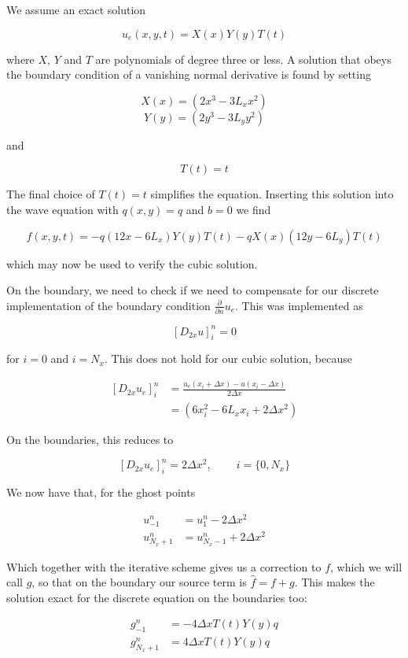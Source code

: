 \documentclass[letterpaper,10pt,english]{/usr/share/sphinx/texinputs/sphinxhowto}
\begin{document}
We assume an exact solution

\[u_e(x,y,t) = X(x)Y(y)T(t)\]

where $X$, $Y$ and $T$ are polynomials of degree three or less. A
solution that obeys the boundary condition of a vanishing normal
derivative is found by setting

\[X(x) = (2x^3 - 3 L_x x^2)\] \[Y(y) = (2y^3 - 3 L_y y^2)\]

and

\[T(t) = t\]

The final choice of $T(t) = t$ simplifies the equation. Inserting this
solution into the wave equation with $q(x,y)=q$ and $b=0$ we find

\[f(x,y,t) = - q (12x - 6L_x) Y(y) T(t) - q X(x)(12y - 6L_y) T(t)\]

which may now be used to verify the cubic solution.

On the boundary, we need to check if we need to compensate for our
discrete implementation of the boundary condition
$\frac{\partial}{\partial n}u_e$. This was implemented as

\[ \left [ D_{2x} u \right]_{i}^n = 0 \]

for $i=0$ and $i=N_x$. This does not hold for our cubic solution,
because

\begin{align*} 
   \left [ D_{2x} u_e \right ]_{i}^n &= \frac{u_e(x_i + \Delta x) - u(x_i - \Delta x)}{2 \Delta x} \\
                                     &= (6x_i^2 - 6 L_x x_i + 2 \Delta x^2)
\end{align*}

On the boundaries, this reduces to

\[
\left [ D_{2x} u_e \right ]_{i}^n = 2 \Delta x^2, \qquad \ i = \{0,N_x\}
\]

We now have that, for the ghost points

\begin{align*}
    u_{-1}^n &= u_{1}^n - 2 \Delta x^2 \\
    u_{N_x + 1}^n &= u_{N_x-1}^n + 2 \Delta x^2
\end{align*}

Which together with the iterative scheme gives us a correction to $f$,
which we will call $g$, so that on the boundary our source term is
$\hat f = f + g$. This makes the solution exact for the discrete
equation on the boundaries too:

\begin{align*}
    g_{-1}^n &= - 4 \Delta x T(t) Y(y) q \\
    g_{N_x + 1}^n &= 4 \Delta x T(t) Y(y) q
\end{align*}
\end{document}
